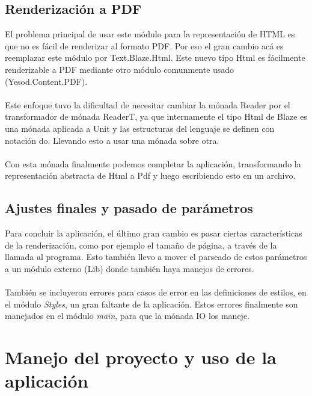 \documentclass{article}
\begin{document}
\subsection{Renderización a PDF}

El problema principal de usar este módulo para la representación de HTML es que no es fácil de renderizar al formato PDF. Por eso el gran cambio acá es reemplazar este módulo por Text.Blaze.Html. Este nuevo tipo Html es fácilmente renderizable a PDF mediante otro módulo comunmente usado (Yesod.Content.PDF).
\\~\\
Este enfoque tuvo la dificultad de necesitar cambiar la mónada Reader por el transformador de mónada ReaderT, ya que internamente el tipo Html de Blaze es una mónada aplicada a Unit y las estructuras del lenguaje se definen con notación do. Llevando esto a usar una mónada sobre otra.
\\~\\
Con esta mónada finalmente podemos completar la aplicación, transformando la representación abstracta de Html a Pdf y luego escribiendo esto en un archivo.

\subsection{Ajustes finales y pasado de parámetros}

Para concluir la aplicación, el último gran cambio es pasar ciertas características de la renderización, como por ejemplo el tamaño de página, a través de la llamada al programa. Esto también llevo a mover el parseado de estos parámetros a un módulo externo (Lib) donde también haya manejos de errores.
\\~\\
También se incluyeron errores para casos de error en las definiciones de estilos, en el módulo \emph{Styles}, un gran faltante de la aplicación. Estos errores finalmente son manejados en el módulo \emph{main}, para que la mónada IO los maneje.

\section{Manejo del proyecto y uso de la aplicación}
\end{document}
